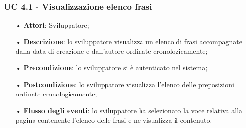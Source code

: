 \subsubsection{UC 4.1 - Visualizzazione elenco frasi}
\begin{itemize}
\item[•]\textbf{Attori}: Sviluppatore;
\item[•]\textbf{Descrizione}: lo sviluppatore visualizza un elenco di frasi accompagnate dalla data di creazione e dall’autore ordinate cronologicamente;
\item[•]\textbf{Precondizione}:  lo sviluppatore si è autenticato nel sistema;%
\item[•]\textbf{Postcondizione}: lo sviluppatore visualizza l'elenco delle preposizioni ordinate cronologicamente;
\item[•]\textbf{Flusso degli eventi}: lo sviluppatore ha selezionato la voce relativa alla pagina contenente l’elenco delle frasi e ne visualizza il contenuto. 
\end{itemize}
